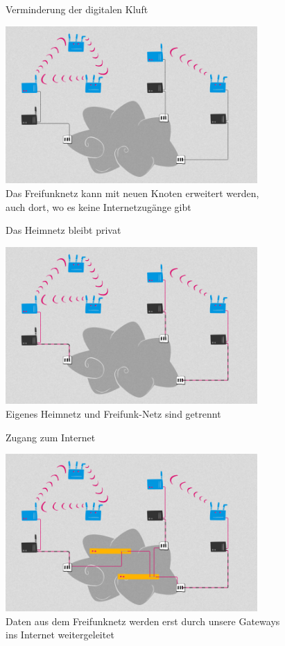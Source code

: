 \documentclass[10pt]{beamer}
\begin{document}
\begin{frame}{Verminderung der digitalen Kluft}
	\begin{center}
		\includegraphics[height=6cm]{images/network_3} \\
		\vfill
		Das Freifunknetz kann mit neuen Knoten erweitert werden,\\ auch dort, wo es keine Internetzugänge gibt
	\end{center}
\end{frame}

\begin{frame}{Das Heimnetz bleibt privat}
	\begin{center}
		\includegraphics[height=6cm]{images/network_4} \\
		\vfill
		Eigenes Heimnetz und Freifunk-Netz sind getrennt
	\end{center}
	
\end{frame}


\begin{frame}{Zugang zum Internet}
	\begin{center}
		\includegraphics[height=6cm]{images/network_5} \\
		\vfill
		Daten aus dem Freifunknetz werden erst durch unsere Gateways\\ ins Internet weitergeleitet
	\end{center}
\end{frame}
\end{document}
